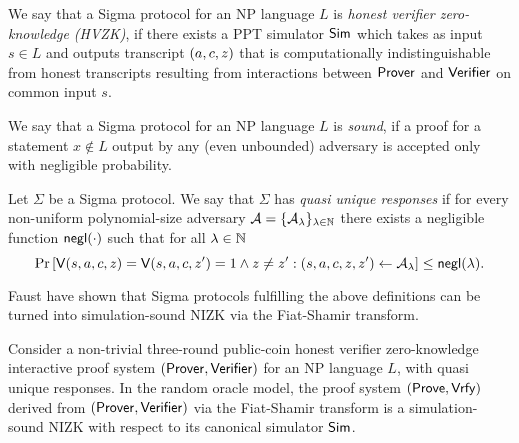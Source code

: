 \begin{definition}
We say that a Sigma protocol for an NP language  $L$ is \emph{honest verifier zero-knowledge (HVZK)}, if there exists a PPT simulator $\mathsf{Sim}$ which takes as input $s \in L$ and outputs transcript $(a,c,z)$ that is computationally indistinguishable from honest
transcripts resulting from interactions between $\mathsf{Prover}$ and $\mathsf{Verifier}$ on common input $s$.
\end{definition}

\begin{definition}[Soundness]
We say that a Sigma protocol for an NP language $L$ is \emph{sound}, if a proof for a statement $x \notin L$ output by any (even unbounded) adversary is accepted only with negligible probability.
\end{definition}

\begin{definition}
Let $\Sigma$ be a Sigma protocol. We say that $\Sigma$ has \emph{quasi unique responses} if for every non-uniform polynomial-size adversary $\mathcal{A} = \{\mathcal{A}_{\lambda}\}_{\lambda \in \mathbb{N}}$ there exists a negligible function $\mathsf{negl}(\cdot)$ such that for all $\lambda \in \mathbb{N}$ 
\[\Pr\left[ \mathsf{V}(s,a,c,z) = \mathsf{V}(s,a,c,z' ) = 1 \land z \neq z' : (s, a, c , z, z')\leftarrow \mathcal{A}_{\lambda} \right] \leq \mathsf{negl}(\lambda).\]
\end{definition}

Faust \etal \cite{INDOCRYPT:FKMV12} have shown that Sigma protocols fulfilling the above definitions can be turned into simulation-sound NIZK via the Fiat-Shamir transform. 

\begin{theorem}\label{thm:fs}
Consider a non-trivial three-round public-coin honest verifier zero-knowledge interactive proof system $(\mathsf{Prover}, \mathsf{Verifier})$ for an NP language $L$, with quasi unique responses. In the random oracle model, the proof system $(\mathsf{Prove}, \mathsf{Vrfy})$ derived from $(\mathsf{Prover}, \mathsf{Verifier})$ via the Fiat-Shamir transform is a simulation-sound NIZK with respect to its canonical simulator $\mathsf{Sim}$.
\end{theorem}

